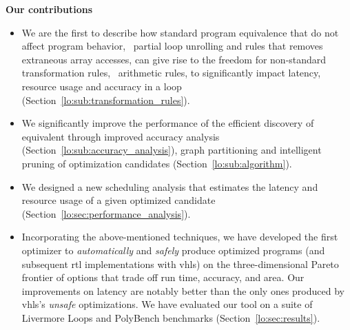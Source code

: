 \begin{trivlist}\item{\bf Our contributions}

\begin{itemize}

    \item We are the first to describe how standard program equivalence
    that do not affect program behavior, \eg~partial loop unrolling and
    rules that removes extraneous array accesses, can give rise to the
    freedom for non-standard transformation rules, \eg~arithmetic rules,
    to significantly impact latency, resource usage and accuracy in a loop
    (Section~\ref{lo:sub:transformation_rules}).

    \item We significantly improve the performance of the
    efficient discovery of equivalent through improved accuracy
    analysis (Section~\ref{lo:sub:accuracy_analysis}), graph
    partitioning and intelligent pruning of optimization candidates
    (Section~\ref{lo:sub:algorithm}).

    \item We designed a new scheduling analysis that estimates
    the latency and resource usage of a given optimized candidate
    (Section~\ref{lo:sec:performance_analysis}).

    \item Incorporating the above-mentioned techniques, we have developed the
    first optimizer to \emph{automatically} and \emph{safely} produce optimized
    programs (and subsequent \gls{rtl} implementations with \gls{vhls}) on
    the three-dimensional Pareto frontier of options that trade off run time,
    accuracy, and area.  Our improvements on latency are notably better than
    the only ones produced by \gls{vhls}'s \emph{unsafe} optimizations. We have
    evaluated our tool on a suite of Livermore Loops and PolyBench benchmarks
    (Section~\ref{lo:sec:results}).

\end{itemize}

\end{trivlist}

